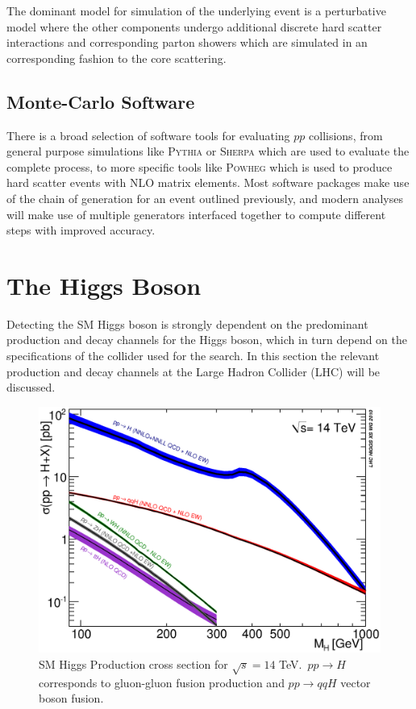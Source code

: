 			The dominant model for simulation of the underlying event is a perturbative model where the other components undergo additional discrete hard scatter interactions and corresponding parton showers which are simulated in an corresponding fashion to the core scattering.

	\subsection{Monte-Carlo Software}

		There is a broad selection of software tools for evaluating $pp$ collisions, from general purpose simulations like \textsc{Pythia}\cite{pythia} or \textsc{Sherpa}\cite{sherpa} which are used to evaluate the complete process, to more specific tools like \textsc{Powheg}\cite{powheg} which is used to produce hard scatter events with NLO matrix elements. Most software packages make use of the chain of generation for an event outlined previously, and modern analyses will make use of multiple generators interfaced together to compute different steps with improved accuracy.

\section{The Higgs Boson}
\label{t:higgs}

	Detecting the SM Higgs boson is strongly dependent on the predominant production and decay channels for the Higgs boson, which in turn depend on the specifications of the collider used for the search. In this section the relevant production and decay channels at the Large Hadron Collider (LHC) will be discussed.

			\begin{figure}[h]
				\centering
				\includegraphics[width=0.7\linewidth]{T/FIGS/YRHXS_Summary_fig3}
				\caption{SM Higgs Production cross section for $\sqrt{s}=14$ TeV. $\,pp\rightarrow H$ corresponds to gluon-gluon fusion production and $pp\rightarrow qqH$ vector boson fusion. \cite{LHCHiggsCS}}
				\label{fig:higgsproductionCS}
			\end{figure}

